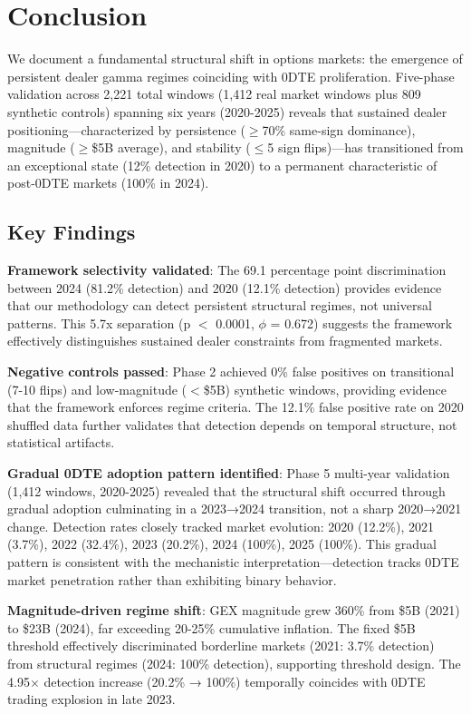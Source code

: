 \section{Conclusion}

We document a fundamental structural shift in options markets: the emergence of persistent dealer gamma regimes coinciding with 0DTE proliferation. Five-phase validation across 2,221 total windows (1,412 real market windows plus 809 synthetic controls) spanning six years (2020-2025) reveals that sustained dealer positioning---characterized by persistence ($\geq$70\% same-sign dominance), magnitude ($\geq$\$5B average), and stability ($\leq$5 sign flips)---has transitioned from an exceptional state (12\% detection in 2020) to a permanent characteristic of post-0DTE markets (100\% in 2024).

\subsection{Key Findings}

\textbf{Framework selectivity validated}: The 69.1 percentage point discrimination between 2024 (81.2\% detection) and 2020 (12.1\% detection) provides evidence that our methodology can detect persistent structural regimes, not universal patterns. This 5.7x separation (p $<$ 0.0001, $\phi$ = 0.672) suggests the framework effectively distinguishes sustained dealer constraints from fragmented markets.

\textbf{Negative controls passed}: Phase 2 achieved 0\% false positives on transitional (7-10 flips) and low-magnitude ($<$\$5B) synthetic windows, providing evidence that the framework enforces regime criteria. The 12.1\% false positive rate on 2020 shuffled data further validates that detection depends on temporal structure, not statistical artifacts.

\textbf{Gradual 0DTE adoption pattern identified}: Phase 5 multi-year validation (1,412 windows, 2020-2025) revealed that the structural shift occurred through gradual adoption culminating in a 2023→2024 transition, not a sharp 2020→2021 change. Detection rates closely tracked market evolution: 2020 (12.2\%), 2021 (3.7\%), 2022 (32.4\%), 2023 (20.2\%), 2024 (100\%), 2025 (100\%). This gradual pattern is consistent with the mechanistic interpretation—detection tracks 0DTE market penetration rather than exhibiting binary behavior.

\textbf{Magnitude-driven regime shift}: GEX magnitude grew 360\% from \$5B (2021) to \$23B (2024), far exceeding 20-25\% cumulative inflation. The fixed \$5B threshold effectively discriminated borderline markets (2021: 3.7\% detection) from structural regimes (2024: 100\% detection), supporting threshold design. The 4.95× detection increase (20.2\% → 100\%) temporally coincides with 0DTE trading explosion in late 2023.

